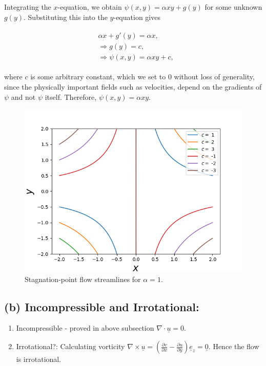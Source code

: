 \documentclass{article}
\begin{document}
Integrating the $x$-equation, we obtain
$\psi(x, y) = \alpha xy + g(y)$ for some unknown $g(y)$. Substituting this into the $y$-equation gives

\begin{align}
 \begin{split}
 & \alpha x + g'(y) = \alpha x, \\
 & \Rightarrow g(y) = c,\\
 & \Rightarrow \psi(x, y) = \alpha xy + c,
 \end{split}
\end{align}

where $c$ is some arbitrary constant, which we set to $0$ without loss of generality, since the physically important fields such as velocities, depend on the gradients of $\psi$ and not $\psi$ itself. Therefore,
$\boxed{\psi(x, y) =  \alpha xy}$.
\begin{figure}[H]
    \centering
    \includegraphics[scale = 0.8]{Figs/xy_c_streamlines.png}
    \caption{Stagnation-point flow streamlines for $\alpha = 1$.}
    \label{fig:xy_c_streamlines}
\end{figure}

\subsection*{(b) Incompressible and Irrotational:}
\begin{enumerate}
 \item Incompressible - proved in above subsection $\nabla \cdot \underline{u} = 0$. 
 \item Irrotational?: Calculating vorticity $\nabla \times \underline{u} = \left(\frac{\partial v}{\partial x} - \frac{\partial u}{\partial y} \right)\underline{e}_{z} = \underline{0}$. Hence the flow is irrotational.
\end{enumerate}
\end{document}
